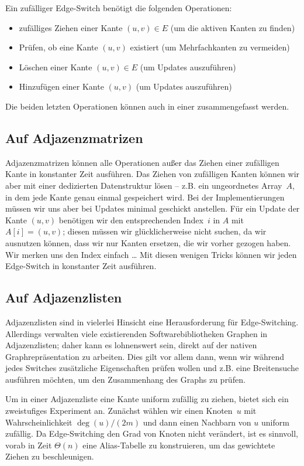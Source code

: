 Ein zufälliger Edge-Switch benötigt die folgenden Operationen:
\begin{itemize}
    \item zufälliges Ziehen einer Kante $(u,v) \in E$ (um die aktiven Kanten zu finden)
    \item Prüfen, ob eine Kante $(u, v)$ existiert (um Mehrfachkanten zu vermeiden)
    \item Löschen einer Kante $(u, v) \in E$ (um Updates auszuführen)
    \item Hinzufügen einer Kante $(u, v)$ (um Updates auszuführen)
\end{itemize}

Die beiden letzten Operationen können auch in einer zusammengefasst werden.

\subsection{Auf Adjazenzmatrizen}
Adjazenzmatrizen können alle Operationen außer das Ziehen einer zufälligen Kante in konstanter Zeit ausführen.
Das Ziehen von zufälligen Kanten können wir aber mit einer dedizierten Datenstruktur lösen --
z.B. ein ungeordnetes Array~$A$, in dem jede Kante genau einmal gespeichert wird.
Bei der Implementierungen müssen wir uns aber bei Updates minimal geschickt anstellen.
Für ein Update der Kante $(u,v)$ benötigen wir den entsprechenden Index~$i$ in $A$ mit $A[i] = (u,v)$;
diesen müssen wir glücklicherweise nicht suchen, da wir ausnutzen können, dass wir nur Kanten ersetzen, die wir vorher gezogen haben.
Wir merken uns den Index einfach \dots
Mit diesen wenigen Tricks können wir jeden Edge-Switch in konstanter Zeit ausführen.

\subsection{Auf Adjazenzlisten}
Adjazenzlisten sind in vielerlei Hinsicht eine Herausforderung für Edge-Switching.
Allerdings verwalten viele existierenden Softwarebibliotheken Graphen in Adjazenzlisten; daher kann es lohnenswert sein, direkt auf der nativen Graphrepräsentation zu arbeiten.
Dies gilt vor allem dann, wenn wir während jedes Switches zusätzliche Eigenschaften prüfen wollen und z.B. eine Breitensuche ausführen möchten, um den Zusammenhang des Graphs zu prüfen.

Um in einer Adjazenzliste eine Kante uniform zufällig zu ziehen, bietet sich ein zweistufiges Experiment an.
Zunächst wählen wir einen Knoten~$u$ mit Wahrscheinlichkeit $\deg(u) / (2m)$ und dann einen Nachbarn von $u$ uniform zufällig.
Da Edge-Switching den Grad von Knoten nicht verändert, ist es sinnvoll, vorab in Zeit $\Theta(n)$ eine Alias-Tabelle zu konstruieren, um das gewichtete Ziehen zu beschleunigen.

